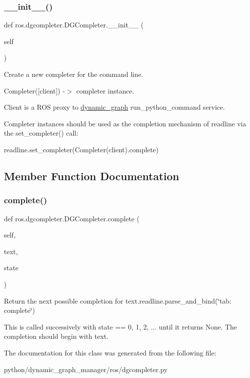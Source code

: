 \subsubsection{\texorpdfstring{\+\_\+\+\_\+init\+\_\+\+\_\+()}{\_\_init\_\_()}}
{\footnotesize\ttfamily def ros.\+dgcompleter.\+D\+G\+Completer.\+\_\+\+\_\+init\+\_\+\+\_\+ (\begin{DoxyParamCaption}\item[{}]{self }\end{DoxyParamCaption})}



Create a new completer for the command line. 

Completer(\mbox{[}client\mbox{]}) -\/$>$ completer instance.

Client is a R\+OS proxy to \hyperlink{namespacedynamic__graph}{dynamic\+\_\+graph} run\+\_\+python\+\_\+command service.

Completer instances should be used as the completion mechanism of readline via the set\+\_\+completer() call\+:

readline.\+set\+\_\+completer(Completer(client).complete) 

\subsection{Member Function Documentation}
\mbox{\label{classros_1_1dgcompleter_1_1DGCompleter_a0662ed6ab4e56fb2a828c5577e03b41e}} 
\subsubsection{\texorpdfstring{complete()}{complete()}}
{\footnotesize\ttfamily def ros.\+dgcompleter.\+D\+G\+Completer.\+complete (\begin{DoxyParamCaption}\item[{}]{self,  }\item[{}]{text,  }\item[{}]{state }\end{DoxyParamCaption})}



Return the next possible completion for \textquotesingle{}text\textquotesingle{}.readline.\+parse\+\_\+and\+\_\+bind(\char`\"{}tab\+: complete\char`\"{}) 

This is called successively with state == 0, 1, 2, ... until it returns None. The completion should begin with \textquotesingle{}text\textquotesingle{}. 

The documentation for this class was generated from the following file\+:\begin{DoxyCompactItemize}
\item 
python/dynamic\+\_\+graph\+\_\+manager/ros/dgcompleter.\+py\end{DoxyCompactItemize}
